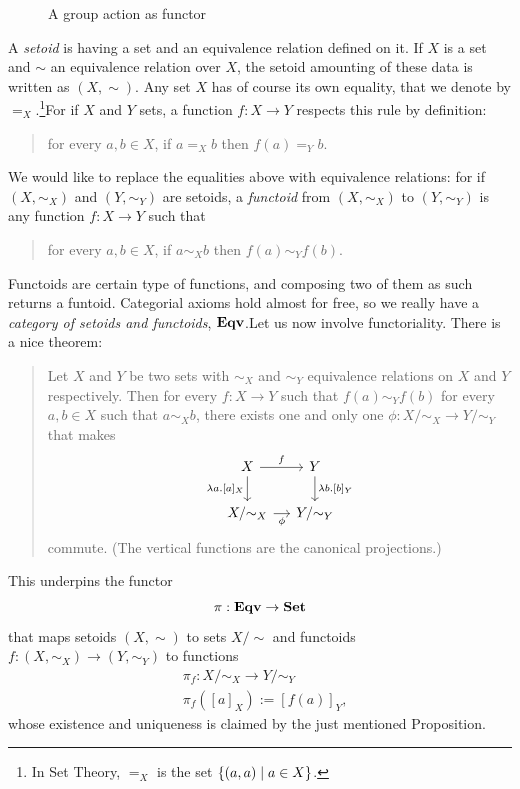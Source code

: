\begin{figure}
  \centering
  
  \caption{A group action as functor}
\end{figure}

\begin{example}\label{example:CategoryEqv}
  A {\em setoid}  is having a
  set and an equivalence relation defined on it. If \(X\) is a set and
  \(\sim\) an equivalence relation over \(X\), the setoid amounting of
  these data is written as \((X, \sim)\). Any set \(X\) has of course its
  own equality, that we denote by \(=_X\).\footnote{In Set Theory,
    \(=_X\) is the set \(\left\{(a, a) \mid a \in X\right\}\).}\newline For if
  \(X\) and \(Y\) sets, a function \(f : X \to Y\) respects this rule by
  definition:
  \begin{quotation}
    for every \(a, b \in X\), if \(a =_X b\) then \(f(a) =_Y b\).
  \end{quotation}
  We would like to replace the equalities above with equivalence
  relations: for if \((X, \sim_X)\) and \((Y, \sim_Y)\) are setoids, a {\em
    functoid} 
  from \((X, \sim_X)\) to \((Y, \sim_Y)\) is any function
  \(f : X \to Y\) such that
  \begin{quotation}
    for every \(a, b \in X\), if \(a \sim_X b\) then \(f(a) \sim_Y f(b)\).
  \end{quotation}
  Functoids are certain type of functions, and composing two of them as
  such returns a funtoid. Categorial axioms hold almost for free, so we
  really have a {\em category of setoids and functoids},
  \(\mathbf{Eqv}\).\newline Let us now involve functoriality. There is a nice theorem:
  \begin{quotation}
    Let \(X\) and \(Y\) be two sets with \(\sim_X\) and \(\sim_Y\) equivalence
    relations on \(X\) and \(Y\) respectively. Then for every
    \(f : X \to Y\) such that \(f(a) \sim_Y f(b)\) for every
    \(a, b \in X\) such that \(a \sim_X b\), there exists one and only one
    \(\phi : X{/}{\sim_X} \to Y{/}{\sim_Y}\) that makes
    \[
      \begin{tikzcd}[column sep=small]
        X \ar["f", r] \ar["{\lambda a.[a]_X}", d, swap] & Y \ar["{\lambda b.[b]_Y}", d] \\
        X{/}{\sim_X} \ar["\phi", r, swap] & Y{/}{\sim_Y}
      \end{tikzcd}
    \]
    commute. (The vertical functions are the canonical projections.)
  \end{quotation}
  This underpins the functor
  \[
    \pi : \mathbf{Eqv} \to \mathbf{Set}
  \]
  that maps setoids \((X, \sim)\) to sets \(X{/}{\sim}\) and functoids
  \(f : (X, \sim_X) \to (Y, \sim_Y)\) to functions
  \[
    \begin{aligned}
      & \pi_f : X{/}{\sim_X} \to Y{/}{\sim_Y} \\
      & \pi_f \left([a]_X\right) := \left[f(a)\right]_Y ,
    \end{aligned}
  \]
  whose existence and uniqueness is claimed by the just mentioned
  Proposition.
\end{example}

